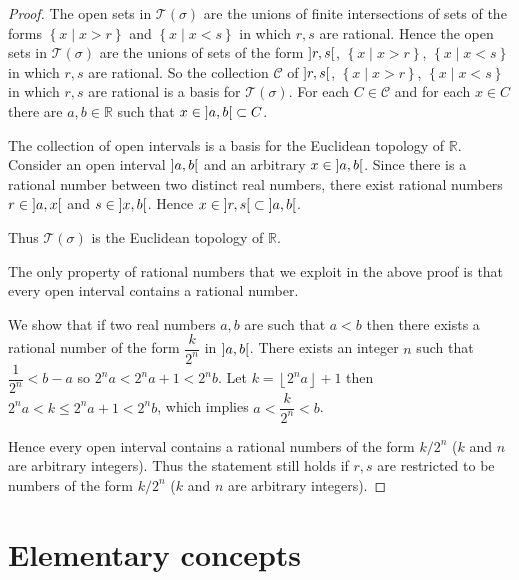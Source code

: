\begin{proof}
    The open sets in \( \mathscr{T}(\sigma) \) are the unions of finite intersections of sets of the forms \( \left\{ x \mid x > r \right\} \) and \( \left\{ x \mid x < s \right\} \) in which \( r, s \) are rational. Hence the open sets in \( \mathscr{T}(\sigma) \) are the unions of sets of the form \( \left\rbrack{r, s}\right\lbrack \), \( \left\{ x \mid x > r \right\} \), \( \left\{ x \mid x < s \right\} \) in which \( r, s \) are rational. So the collection \( \mathscr{C} \) of \( \left\rbrack{r, s}\right\lbrack \), \( \left\{ x \mid x > r \right\} \), \( \left\{ x \mid x < s \right\} \) in which \( r, s \) are rational is a basis for \( \mathscr{T}(\sigma) \). For each \( C \in \mathscr{C} \) and for each \( x \in C \) there are \( a, b \in \mathbb{R} \) such that \( x \in \left\rbrack{a, b}\right\lbrack \subset C \).

    The collection of open intervals is a basis for the Euclidean topology of \( \mathbb{R} \). Consider an open interval \( \left\rbrack{a, b}\right\lbrack \) and an arbitrary \( x \in \left\rbrack{a, b}\right\lbrack \). Since there is a rational number between two distinct real numbers, there exist rational numbers \( r \in \left\rbrack{a, x}\right\lbrack \) and \( s \in \left\rbrack{x, b}\right\lbrack \). Hence \( x \in \left\rbrack{r, s}\right\lbrack \subset \left\rbrack{a, b}\right\lbrack \).

    Thus \( \mathscr{T}(\sigma) \) is the Euclidean topology of \( \mathbb{R} \).

    The only property of rational numbers that we exploit in the above proof is that every open interval contains a rational number.

    We show that if two real numbers \( a, b \) are such that \( a < b \) then there exists a rational number of the form \( \dfrac{k}{2^{n}} \) in \( \left\rbrack{a, b}\right\lbrack \). There exists an integer \( n \) such that \( \dfrac{1}{2^{n}} < b - a \) so \( 2^{n}a < 2^{n}a + 1 < 2^{n}b \). Let \( k = \left\lfloor 2^{n}a \right\rfloor + 1 \) then \( 2^{n}a < k \le 2^{n}a + 1 < 2^{n}b \), which implies \( a < \dfrac{k}{2^{n}} < b \).

    Hence every open interval contains a rational numbers of the form \( k/2^{n} \) (\(k\) and \(n\) are arbitrary integers). Thus the statement still holds if \( r, s \) are restricted to be numbers of the form \( k/2^{n} \) (\(k\) and \(n\) are arbitrary integers).
\end{proof}

\section{Elementary concepts}

